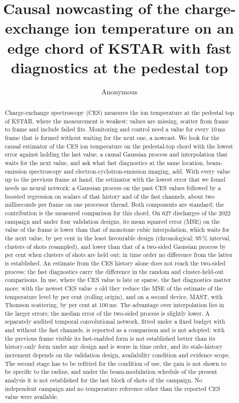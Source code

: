 \documentclass[11pt,a4paper]{article}
\title{Causal nowcasting of the charge-exchange ion temperature on an edge chord of KSTAR
with fast diagnostics at the pedestal top}
\author{Anonymous}
\date{}
\begin{document}
\maketitle

\begin{abstract}
\noindent
Charge-exchange spectroscopy (CES) measures the ion temperature at the pedestal top of KSTAR, where the measurement is weakest: values are missing, scatter from frame to frame and include failed fits. Monitoring and control need a value for every 10\,ms frame that is formed without waiting for the next one, a nowcast. We look for the causal estimator of the CES ion temperature on the pedestal-top chord with the lowest error against holding the last value, a causal Gaussian process and interpolation that waits for the next value, and ask what fast diagnostics at the same location, beam-emission spectroscopy and electron-cyclotron-emission imaging, add. With every value up to the previous frame at hand, the estimator with the lowest error that we found needs no neural network: a Gaussian process on the past CES values followed by a boosted regression on scalars of that history and of the fast channels, about two milliseconds per frame on one processor thread. Both components are standard; the contribution is the measured comparison for this chord. On 627 discharges of the 2022 campaign and under four validation designs, its mean squared error (MSE) on the value of the frame is lower than that of monotone cubic interpolation, which waits for the next value, by \TXoverPchipVfoura{} per cent in the least favourable design (chronological; 95\,\% interval, clusters of shots resampled), and lower than that of a two-sided Gaussian process by \TXoverOfflineVtwo{} per cent when clusters of shots are held out; in time order no difference from the latter is established. An estimate from the CES history alone does not reach the two-sided process: the fast diagnostics carry the difference in the random and cluster-held-out comparisons. In use, where the CES value is late or sparse, the fast diagnostics matter more: with the newest CES value \AgeMedianS\,s old they reduce the MSE of the estimate of the temperature level by \IncDsixfiftyVthree{} per cent (rolling origin), and on a second device, MAST, with Thomson scattering, by \IncMastDhundredMthree{} per cent at 100\,ms. The advantage over interpolation lies in the larger errors; the median error of the two-sided process is slightly lower. A separately audited temporal convolutional network, fitted under a fixed budget with and without the fast channels, is reported as a comparison and is not adopted: with the previous frame visible its fast-enabled form is not established better than its history-only form under any design and is worse in time order, and its stale-history increment depends on the validation design, availability condition and evidence scope. The second stage has to be refitted for the condition of use, the gain is not shown to be specific to the radius, and under the beam-modulation schedule of the present analysis it is not established for the last block of shots of the campaign. No independent campaign and no temperature reference other than the reported CES value were available.

\end{abstract}
\end{document}
